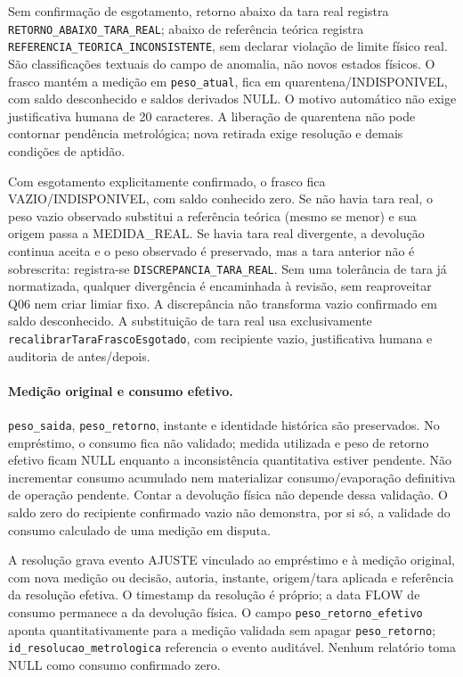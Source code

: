 Sem confirmação de esgotamento, retorno abaixo da tara real registra \texttt{RETORNO\_ABAIXO\_TARA\_REAL}; abaixo de referência teórica registra \texttt{REFERENCIA\_TEORICA\_INCONSISTENTE}, sem declarar violação de limite físico real. São classificações textuais do campo de anomalia, não novos estados físicos. O frasco mantém a medição em \texttt{peso\_atual}, fica em quarentena/INDISPONIVEL, com saldo desconhecido e saldos derivados NULL. O motivo automático não exige justificativa humana de 20 caracteres. A liberação de quarentena não pode contornar pendência metrológica; nova retirada exige resolução e demais condições de aptidão.

Com esgotamento explicitamente confirmado, o frasco fica VAZIO/INDISPONIVEL, com saldo conhecido zero. Se não havia tara real, o peso vazio observado substitui a referência teórica (mesmo se menor) e sua origem passa a MEDIDA\_REAL. Se havia tara real divergente, a devolução continua aceita e o peso observado é preservado, mas a tara anterior não é sobrescrita: registra-se \texttt{DISCREPANCIA\_TARA\_REAL}. Sem uma tolerância de tara já normatizada, qualquer divergência é encaminhada à revisão, sem reaproveitar Q06 nem criar limiar fixo. A discrepância não transforma vazio confirmado em saldo desconhecido. A substituição de tara real usa exclusivamente \nolinkurl{recalibrarTaraFrascoEsgotado}, com recipiente vazio, justificativa humana e auditoria de antes/depois.

\paragraph{Medição original e consumo efetivo.}
\texttt{peso\_saida}, \texttt{peso\_retorno}, instante e identidade histórica são preservados. No empréstimo, o consumo fica não validado; medida utilizada e peso de retorno efetivo ficam NULL enquanto a inconsistência quantitativa estiver pendente. Não incrementar consumo acumulado nem materializar consumo/evaporação definitiva de operação pendente. Contar a devolução física não depende dessa validação. O saldo zero do recipiente confirmado vazio não demonstra, por si só, a validade do consumo calculado de uma medição em disputa.

A resolução grava evento AJUSTE vinculado ao empréstimo e à medição original, com nova medição ou decisão, autoria, instante, origem/tara aplicada e referência da resolução efetiva. O timestamp da resolução é próprio; a data FLOW de consumo permanece a da devolução física. O campo \texttt{peso\_retorno\_efetivo} aponta quantitativamente para a medição validada sem apagar \texttt{peso\_retorno}; \texttt{id\_resolucao\_metrologica} referencia o evento auditável. Nenhum relatório toma NULL como consumo confirmado zero.

